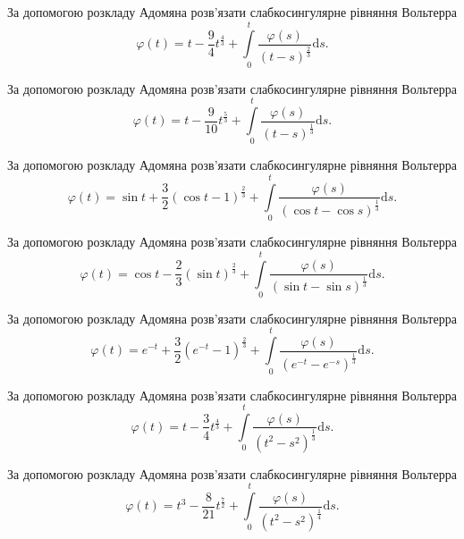 \documentclass[12pt]{extarticle}
\begin{document}
\begin{Exercise}
За допомогою розкладу Адомяна розв’язати слабкосингулярне рівняння Вольтерра \[\varphi(t) = t - \dfrac{9}{4} t^{\frac{4}{3}} + \int\limits_{0}^{t} \dfrac{\varphi(s)}{(t - s)^\frac{2}{3}} \mathrm{d}s.\]
\end{Exercise}

\begin{Exercise}
За допомогою розкладу Адомяна розв’язати слабкосингулярне рівняння Вольтерра \[\varphi(t) = t - \dfrac{9}{10} t^{\frac{5}{3}} + \int\limits_{0}^{t} \dfrac{\varphi(s)}{(t - s)^\frac{1}{3}} \mathrm{d}s.\]
\end{Exercise}

\begin{Exercise}
За допомогою розкладу Адомяна розв’язати слабкосингулярне рівняння Вольтерра \[\varphi(t) = \sin t + \dfrac{3}{2}\left(\cos t - 1\right)^{\frac{2}{3}} + \int\limits_{0}^{t} \dfrac{\varphi(s)}{(\cos t - \cos s)^\frac{1}{3}} \mathrm{d}s.\]
\end{Exercise}

\begin{Exercise}
За допомогою розкладу Адомяна розв’язати слабкосингулярне рівняння Вольтерра \[\varphi(t) = \cos t - \dfrac{2}{3}\left(\sin t\right)^{\frac{2}{3}} + \int\limits_{0}^{t} \dfrac{\varphi(s)}{(\sin t - \sin s)^\frac{1}{3}} \mathrm{d}s.\]
\end{Exercise}

\begin{Exercise}
За допомогою розкладу Адомяна розв’язати слабкосингулярне рівняння Вольтерра \[\varphi(t) = e^{-t} + \dfrac{3}{2}\left(e^{-t} - 1\right)^{\frac{2}{3}} + \int\limits_{0}^{t} \dfrac{\varphi(s)}{(e^{-t} - e^{-s})^\frac{1}{3}} \mathrm{d}s.\]
\end{Exercise}

\begin{Exercise}
За допомогою розкладу Адомяна розв’язати слабкосингулярне рівняння Вольтерра \[\varphi(t) = t - \dfrac{3}{4} t^{\frac{4}{3}} + \int\limits_{0}^{t} \dfrac{\varphi(s)}{(t^2 - s^2)^\frac{1}{3}} \mathrm{d}s.\]
\end{Exercise}

\begin{Exercise}
За допомогою розкладу Адомяна розв’язати слабкосингулярне рівняння Вольтерра \[\varphi(t) = t^3 - \dfrac{8}{21}t^{\frac{7}{2}} + \int\limits_{0}^{t} \dfrac{\varphi(s)}{(t^2 - s^2)^\frac{1}{4}} \mathrm{d}s.\]
\end{Exercise}
\end{document}
